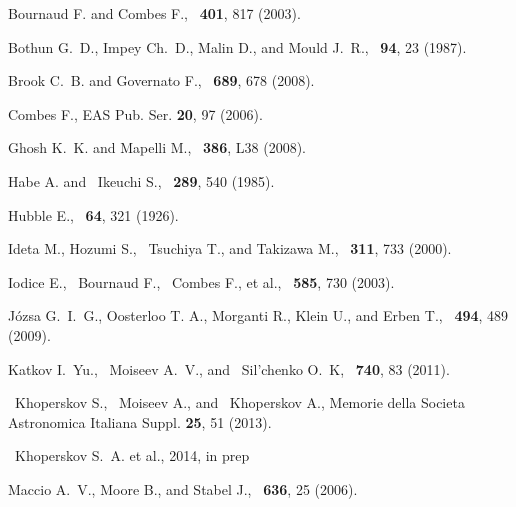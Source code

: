 \documentclass{ab}
\begin{document}
\begin{thebibliography}{}

 Bournaud  F. and Combes F., \aap\ \textbf{401}, 817 (2003).

Bothun  G.~D., Impey Ch.~D., Malin D., and Mould J.~R.,   \aj\ \textbf{94}, 23 (1987).

 Brook C.~B. and Governato F., \aj\ \textbf{689}, 678 (2008).

Combes F., EAS Pub. Ser. \textbf{20},   97 (2006).


Ghosh  K.~K. and Mapelli M., \mnras\ \textbf{386}, L38  (2008).

Habe  A. and ~Ikeuchi S.,  \apj\ \textbf{289}, 540 (1985).

Hubble  E.,  \apj\ \textbf{64}, 321  (1926).


Ideta  M., Hozumi S., ~Tsuchiya T., and Takizawa M., \mnras\ \textbf{311}, 733 (2000).

 Iodice E., ~Bournaud F., ~Combes F., et al., \apj\ \textbf{585}, 730 (2003).

 J\'ozsa G.~I.~G.,  Oosterloo T. A.,   Morganti R.,  Klein U., and  Erben T.,   \aap\ \textbf{494}, 489 (2009).


Katkov  I.~Yu.,  ~Moiseev A.~V., and ~Sil'chenko O.~K, \apj\  \textbf{740}, 83 (2011).

~Khoperskov  S.,  ~Moiseev A., and ~Khoperskov A., Memorie della Societa Astronomica Italiana Suppl. {\bf 25}, 51 (2013).

~Khoperskov  S.~A. et al., 2014, in prep

 Maccio A.~V.,  Moore B., and  Stabel J., \aj\ \textbf{636}, 25 (2006).



\end{thebibliography}
\end{document}
